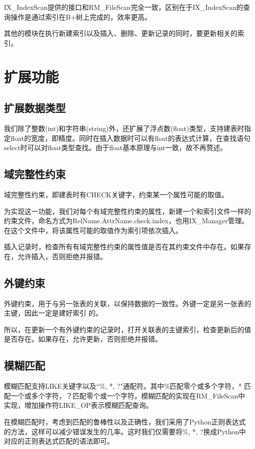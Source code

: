 IX\_IndexScan提供的接口和RM\_FileScan完全一致，区别在于IX\_IndexScan的查询操作是通过索引在B+树上完成的，效率更高。

其他的模块在执行新建索引以及插入、删除、更新记录的同时，要更新相关的索引。

\section{扩展功能}

\subsection{扩展数据类型}

我们除了整数(int)和字符串(string)外，还扩展了浮点数(float)类型，支持建表时指定float的宽度，即精度。同时在插入数据时可以有float的表达式计算，在查找语句select时可以对float类型查找。由于float基本原理与int一致，故不再赘述。

\subsection{域完整性约束}
域完整性约束，即建表时有CHECK关键字，约束某一个属性可能的取值。

为实现这一功能，我们对每个有域完整性约束的属性，新建一个和索引文件一样的约束文件，命名方式为RelName.AttrName.check.index，也用IX\_Manager管理。在这个文件中，将该属性可能的取值作为索引项依次插入。

插入记录时，检查所有有域完整性约束的属性值是否在其约束文件中存在。如果存在，允许插入，否则拒绝并报错。

\subsection{外键约束}
外键约束，用于与另一张表的关联，以保持数据的一致性。外键一定是另一张表的主键，因此一定是建好索引
的。

所以，在更新一个有外键约束的记录时，打开关联表的主键索引，检查更新后的值是否存在。如果存在，允许更新，否则拒绝并报错。

\subsection{模糊匹配}

模糊匹配支持LIKE关键字以及“\%, *, ?"通配符。其中\%匹配零个或多个字符，* 匹配一个或多个字符，？匹配零个或一个字符。模糊匹配的实现在RM\_FileScan中实现，增加操作符LIKE\_OP表示模糊匹配查询。

在模糊匹配时，考虑到匹配的鲁棒性以及正确性，我们采用了Python正则表达式的方法，这样可以减少错误发生的几率。这时我们仅需要将\%, *, ?换成Python中对应的正则表达式匹配的语法即可。

